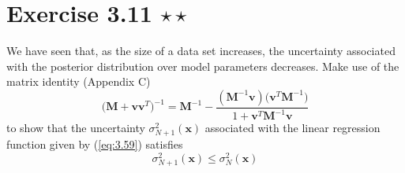 \section*{Exercise 3.11 $\star \star$}
We have seen that, as the size of a data set increases, the uncertainty associated
with the posterior distribution over model parameters decreases. Make use of the
matrix identity (Appendix C)
\begin{equation*}
    \big(\mathbf{M} + \mathbf{v}\mathbf{v}^T\big)^{-1}
    = \mathbf{M}^{-1} - \frac{(\mathbf{M}^{-1}\mathbf{v})\big(\mathbf{v}^T\mathbf{M}^{-1}\big)}
        {1 + \mathbf{v}^T\mathbf{M}^{-1}\mathbf{v}}
    \tag{3.110}\label{eq:3.110}
\end{equation*}
to show that the uncertainty $\sigma^2_{N + 1}(\mathbf{x})$ associated with the
linear regression function given by (\ref{eq:3.59}) satisfies
\begin{equation*}
    \sigma^2_{N + 1}(\mathbf{x}) \leq \sigma^2_N(\mathbf{x})
    \tag{3.111}\label{eq:3.111}
\end{equation*}

\vspace{1em}

